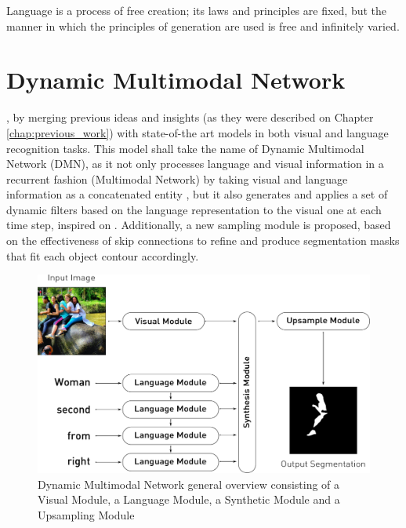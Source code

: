 \begin{savequote}[75mm]
Language is a process of free creation; its laws and principles are fixed, but the manner in which the principles of generation are used is free and infinitely varied.
\end{savequote}

\chapter{Dynamic Multimodal Network}
\label{chapter:dmn}

, by merging previous ideas and insights (as they were described on Chapter \ref{chap:previous_work}) with state-of-the art models in both visual and language recognition tasks. This model shall take the name of Dynamic Multimodal Network (DMN), as it not only processes language and visual information in a recurrent fashion \cite{li2017cvpr} (Multimodal Network) by taking visual and language information as a concatenated entity \cite{hu2016segmentation}, but it also generates and applies a set of dynamic filters based on the language representation to the visual one at each time step, inspired on \cite{liu2017segmentation}. Additionally, a new sampling module is proposed, based on the effectiveness of skip connections \cite{DBLP:journals/corr/RonnebergerFB15} to refine and produce segmentation masks that fit each object contour accordingly.


\begin{figure}
\centering
\includegraphics[width=\textwidth]{./figures/Model_Overview.pdf}
\caption{Dynamic Multimodal Network general overview consisting of a Visual Module, a Language Module, a Synthetic Module and a Upsampling Module}
\label{Fig:Overall}
\end{figure}

